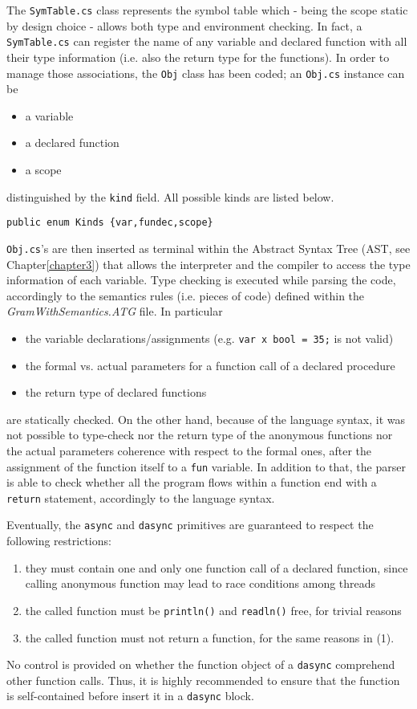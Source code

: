 The \texttt{SymTable.cs} class represents the \fwap symbol table which - being the scope static by design choice - allows both type and environment checking. In fact, a \texttt{SymTable.cs} can register the name of any variable and declared function with all their type information (i.e. also the return type for the functions). In order to manage those associations, the \texttt{Obj} class has been coded; an \texttt{Obj.cs} instance can be

\begin{itemize}
	\item a variable
	\item a declared function
	\item a scope
\end{itemize}

distinguished by the \texttt{kind} field. All possible kinds are listed below.

\begin{lstlisting}[caption=Labels for \texttt{Node}'s.]
public enum Kinds {var,fundec,scope}
\end{lstlisting}

\texttt{Obj.cs}'s are then inserted as terminal within the Abstract Syntax Tree (AST, see Chapter\ref{chapter3}) that allows the interpreter and the compiler to access the type information of each variable. Type checking is executed while parsing the \fwap code, accordingly to the semantics rules (i.e. pieces of code) defined within the \textit{GramWithSemantics.ATG} file. In particular
\begin{itemize}
	\item the variable declarations/assignments (e.g. \texttt{var x bool = 35;} is not valid)
	\item the formal vs. actual parameters for a function call of a declared procedure
	\item the return type of declared functions 
\end{itemize}
are statically checked. On the other hand, because of the language syntax, it was not possible to type-check nor the return type of the anonymous functions nor the actual parameters coherence with respect to the formal ones, after the assignment of the function itself to a \texttt{fun} variable. In addition to that, the parser is able to check whether all the program flows within a function end with a \texttt{return} statement, accordingly to the language syntax. 

Eventually, the \texttt{async} and \texttt{dasync} primitives are guaranteed to respect the following restrictions:
\begin{enumerate}
	\item they must contain one and only one function call of a declared function, since calling anonymous function may lead to race conditions among threads
	\item the called function must be \texttt{println()} and \texttt{readln()} free, for trivial reasons
	\item the called function must not return a function, for the same reasons in (1).
\end{enumerate}

No control is provided on whether the function object of a \texttt{dasync} comprehend other function calls. Thus, it is highly recommended to ensure that the function is self-contained before insert it in a \texttt{dasync} block. 

